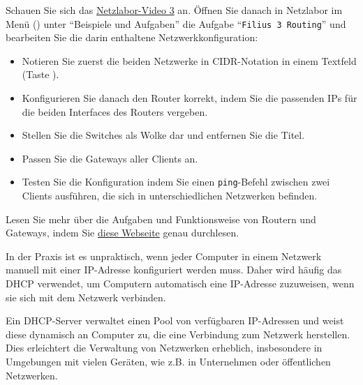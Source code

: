 \begin{myexercise}
	Schauen Sie sich das \href{\netzlaborvideos}{Netzlabor-Video 3} an. Öffnen Sie danach in Netzlabor im Menü (\faBars) unter \enquote{Beispiele und Aufgaben} die Aufgabe \enquote{\texttt{Filius 3 Routing}} und bearbeiten Sie die darin enthaltene Netzwerkkonfiguration:
	\begin{itemize}
		\item Notieren Sie zuerst die beiden Netzwerke in \gls{CIDR}-Notation in einem Textfeld (Taste ).
		\item Konfigurieren Sie danach den Router korrekt, indem Sie die passenden \glspl{IP} für die beiden Interfaces des Routers vergeben.
		\item Stellen Sie die Switches als Wolke dar und entfernen Sie die Titel.
		\item Passen Sie die Gateways aller Clients an.
		\item Testen Sie die Konfiguration indem Sie einen \texttt{ping}-Befehl zwischen zwei Clients ausführen, die sich in unterschiedlichen Netzwerken befinden.
	\end{itemize}
\end{myexercise}

\begin{mychallenge}
	Lesen Sie mehr über die Aufgaben und Funktionsweise von Routern und Gateways, indem Sie \href{https://inf-schule.de/rechnernetze/filius/vernetzungrechnernetze/konzept_router}{diese Webseite} genau durchlesen.
\end{mychallenge}


\begin{myremark}
	In der Praxis ist es unpraktisch, wenn jeder Computer in einem Netzwerk manuell mit einer \gls{IP}-Adresse konfiguriert werden muss. Daher wird häufig das \acrfull{DHCP} verwendet, um Computern automatisch eine \gls{IP}-Adresse zuzuweisen, wenn sie sich mit dem Netzwerk verbinden.

	Ein \gls{DHCP}-Server verwaltet einen Pool von verfügbaren \gls{IP}-Adressen und weist diese dynamisch an Computer zu, die eine Verbindung zum Netzwerk herstellen. Dies erleichtert die Verwaltung von Netzwerken erheblich, insbesondere in Umgebungen mit vielen Geräten, wie z.B. in Unternehmen oder öffentlichen Netzwerken.
\end{myremark}

